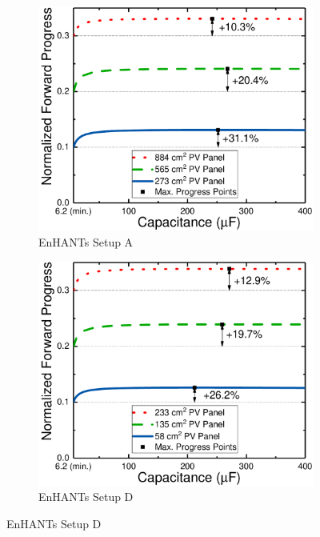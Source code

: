 \begin{figure}[!t]
    \centering
    \begin{subfigure}{0.49\columnwidth}
        \centering
        \includegraphics[width=\columnwidth]{ch4_sizingapproach/figures/HarvStorTgFig1}
        \caption{EnHANTs Setup A}
        \label{fig:harvstor1}
    \end{subfigure}
    \begin{subfigure}{0.49\columnwidth}
        \centering
        \includegraphics[width=\columnwidth]{ch4_sizingapproach/figures/HarvStorTgFig2}
        \caption{EnHANTs Setup D}

\end{subfigure}
\end{figure}
